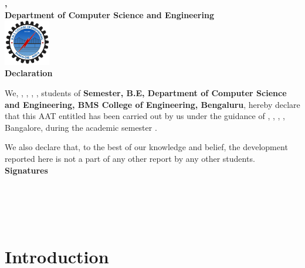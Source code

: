 \documentclass[a4paper,12pt]{report}
\begin{document}
\newpage
\begin{titlepage}
    \centering
    \textbf{\large \collegename,} \\
    \textbf{Department of Computer Science and Engineering} \\[1cm]

    \includegraphics[width=2cm]{../assets/college_logo.png} \\[1cm]

    \textbf{\LARGE Declaration} \\[1cm]
    \raggedright

    \begin{justify}
    We, \textbf{\one}, \textbf{\two}, \textbf{\three}, \textbf{\four}, students of \textbf{{\semester} Semester, B.E, Department of Computer Science and Engineering, BMS College of Engineering, Bengaluru}, 
    hereby declare that this AAT entitled \textbf{\projectname } has been carried out by us under the guidance of \textbf{\guidename}, {\guidedesignation}, {\guidedept}, {\collegename}, Bangalore, during the academic semester \textbf{\academicsemester}.

    \end{justify}

    We also declare that, to the best of our knowledge and belief, the development reported here is not a part of any other report by any other students. \\[1cm]

    \hfill \textbf{Signatures} \\[1cm]

    \textbf{\one } \\ [1cm]
    \textbf{\two } \\ [1cm]
    \textbf{\three } \\ [1cm]
    \textbf{\four } \\ [1cm]
\end{titlepage}

\newpage
\tableofcontents
\listoffigures
\listoftables

\chapter{Introduction}
\end{document}
